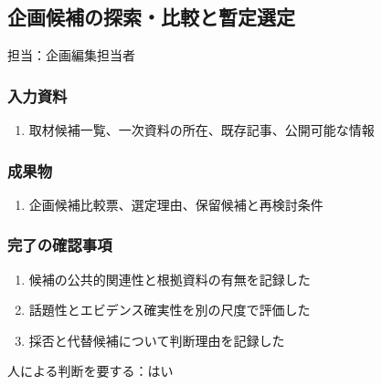 \documentclass[a4paper,11pt]{article}
\begin{document}
\subsection{企画候補の探索・比較と暫定選定}
\par 担当：企画編集担当者\par\medskip
\subsubsection*{入力資料}
\begin{enumerate}[leftmargin=2em,itemsep=0.35em]
\item 取材候補一覧、一次資料の所在、既存記事、公開可能な情報
\end{enumerate}
\subsubsection*{成果物}
\begin{enumerate}[leftmargin=2em,itemsep=0.35em]
\item 企画候補比較票、選定理由、保留候補と再検討条件
\end{enumerate}
\subsubsection*{完了の確認事項}
\begin{enumerate}[leftmargin=2em,itemsep=0.35em]
\item 候補の公共的関連性と根拠資料の有無を記録した
\item 話題性とエビデンス確実性を別の尺度で評価した
\item 採否と代替候補について判断理由を記録した
\end{enumerate}
\par 人による判断を要する：はい\par\medskip
\end{document}
